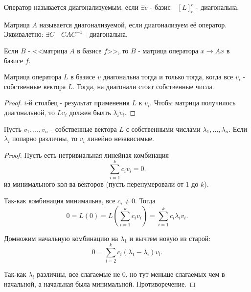 \begin{definition} \thmslashn 

    Оператор называется диагонализуемым, если $\exists{e \text{ - базис}}\quad [L]_{e}^{e}$ - диагональна.

    Матрица $A$ называется диагонализуемой, если диагонализуем её оператор. Эквивалетно: $\exists{C}\quad CAC^{-1}$ - диагональна.
\end{definition}
\begin{remark} \thmslashn

    Если $B$ - <<матрица $A$ в базисе $f$>>, то $B$ - матрица оператора $x \to Ax$ в базисе $f$.
\end{remark}
\begin{lemma} \thmslashn

    Матрица оператора $L$ в базисе $v$ диагональна тогда и только тогда, когда все $v_{i}$ - собственные вектора $L$. Тогда, на диагонали стоят собственные числа.
    \begin{proof} \thmslashn
    
        $i$-й столбец - результат применения $L$ к $v_{i}$. Чтобы матрица получилось диагональной, то $Lv_{i}$ должен былть $\lambda_{i}v_{i}$.
    \end{proof}
\end{lemma}
\begin{theorem} \thmslashn

    Пусть $v_1, \ldots, v_{n}$ - собственные вектора $L$ с собственными числами $\lambda_1, \ldots, \lambda_{n}$. Если $\lambda_{i}$ попарно различны, то $v_{i}$ линейно независимые.
    \begin{proof} \thmslashn
    
        Пусть есть нетривиальная линейная комбинация
        \[ \sum\limits_{i=1}^{k} c_{i}v_{i} = 0 .\]
        из минимального кол-ва векторов (пусть перенумеровали от $1$ до $k$).

        Так-как комбинация минимальна, все $c_{i} \neq 0$. Тогда
        \[ 0 = L(0) = L\left( \sum\limits_{i=1}^{k} c_{i}v_{i} \right) = \sum\limits_{i=1}^{k} c_{i}\lambda_{i}v_{i}  .\]

        Домножим начальную комбинацию на $\lambda_1$ и вычтем новую из старой:
        \[ 0 = \sum\limits_{i=2}^{k} c_{i}(\lambda_1 - \lambda_{i})v_{i} .\]

        Так-как $\lambda_{i}$ различны, все слагаемые не $0$, но тут меньше слагаемых чем в начальной, а начальная была минимальной. Противоречение.
    \end{proof}
\end{theorem}
